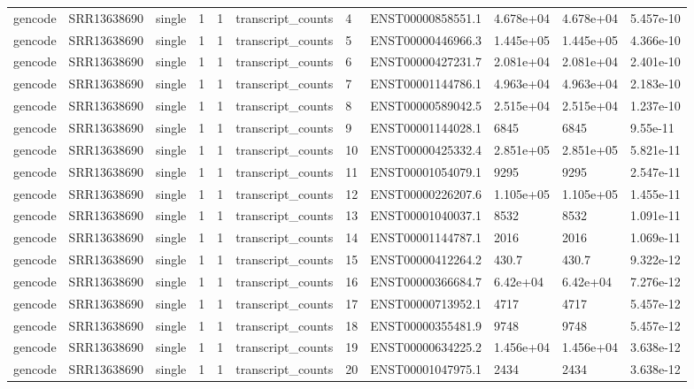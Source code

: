 \begin{tabular}{lllllllllll}
gencode & SRR13638690 & single & 1 & 1 & transcript\_counts & 4 & ENST00000858551.1 & 4.678e+04 & 4.678e+04 & 5.457e-10 \\
gencode & SRR13638690 & single & 1 & 1 & transcript\_counts & 5 & ENST00000446966.3 & 1.445e+05 & 1.445e+05 & 4.366e-10 \\
gencode & SRR13638690 & single & 1 & 1 & transcript\_counts & 6 & ENST00000427231.7 & 2.081e+04 & 2.081e+04 & 2.401e-10 \\
gencode & SRR13638690 & single & 1 & 1 & transcript\_counts & 7 & ENST00001144786.1 & 4.963e+04 & 4.963e+04 & 2.183e-10 \\
gencode & SRR13638690 & single & 1 & 1 & transcript\_counts & 8 & ENST00000589042.5 & 2.515e+04 & 2.515e+04 & 1.237e-10 \\
gencode & SRR13638690 & single & 1 & 1 & transcript\_counts & 9 & ENST00001144028.1 & 6845 & 6845 & 9.55e-11 \\
gencode & SRR13638690 & single & 1 & 1 & transcript\_counts & 10 & ENST00000425332.4 & 2.851e+05 & 2.851e+05 & 5.821e-11 \\
gencode & SRR13638690 & single & 1 & 1 & transcript\_counts & 11 & ENST00001054079.1 & 9295 & 9295 & 2.547e-11 \\
gencode & SRR13638690 & single & 1 & 1 & transcript\_counts & 12 & ENST00000226207.6 & 1.105e+05 & 1.105e+05 & 1.455e-11 \\
gencode & SRR13638690 & single & 1 & 1 & transcript\_counts & 13 & ENST00001040037.1 & 8532 & 8532 & 1.091e-11 \\
gencode & SRR13638690 & single & 1 & 1 & transcript\_counts & 14 & ENST00001144787.1 & 2016 & 2016 & 1.069e-11 \\
gencode & SRR13638690 & single & 1 & 1 & transcript\_counts & 15 & ENST00000412264.2 & 430.7 & 430.7 & 9.322e-12 \\
gencode & SRR13638690 & single & 1 & 1 & transcript\_counts & 16 & ENST00000366684.7 & 6.42e+04 & 6.42e+04 & 7.276e-12 \\
gencode & SRR13638690 & single & 1 & 1 & transcript\_counts & 17 & ENST00000713952.1 & 4717 & 4717 & 5.457e-12 \\
gencode & SRR13638690 & single & 1 & 1 & transcript\_counts & 18 & ENST00000355481.9 & 9748 & 9748 & 5.457e-12 \\
gencode & SRR13638690 & single & 1 & 1 & transcript\_counts & 19 & ENST00000634225.2 & 1.456e+04 & 1.456e+04 & 3.638e-12 \\
gencode & SRR13638690 & single & 1 & 1 & transcript\_counts & 20 & ENST00001047975.1 & 2434 & 2434 & 3.638e-12 \\

\end{tabular}
